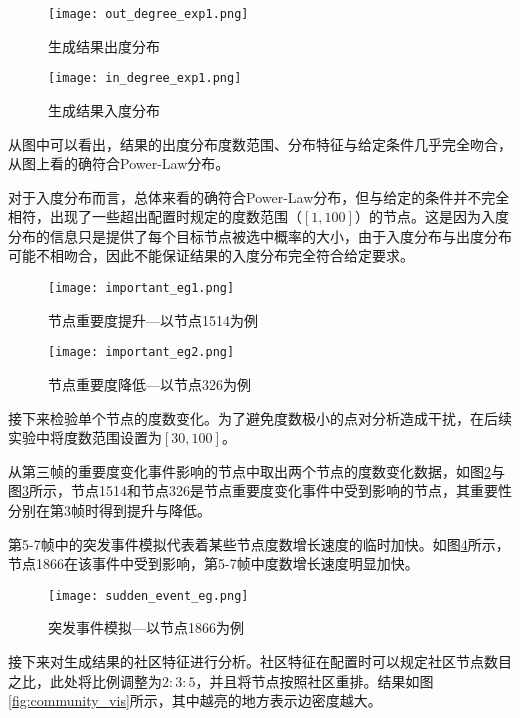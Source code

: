 \begin{figure}
\begin{minipage}{0.48\textwidth}
  \centering
  \texttt{[image: out\_degree\_exp1.png]}
  \caption{生成结果出度分布}
  \label{fig:parallel1}
\end{minipage}\hfill
\begin{minipage}{0.48\textwidth}
  \centering
  \texttt{[image: in\_degree\_exp1.png]}
  \caption{生成结果入度分布}
  \label{fig:parallel2}
\end{minipage}
\end{figure}

从图中可以看出，结果的出度分布度数范围、分布特征与给定条件几乎完全吻合，从图上看的确符合Power-Law分布。

对于入度分布而言，总体来看的确符合Power-Law分布，但与给定的条件并不完全相符，出现了一些超出配置时规定的度数范围（$[1, 100]$）的节点。这是因为入度分布的信息只是提供了每个目标节点被选中概率的大小，由于入度分布与出度分布可能不相吻合，因此不能保证结果的入度分布完全符合给定要求。

\begin{figure}[H]
  \centering
  \texttt{[image: important\_eg1.png]}
  \caption{节点重要度提升—以节点1514为例}
  \label{fig:important_eg1}
\end{figure}

\begin{figure}[H]
  \centering
  \texttt{[image: important\_eg2.png]}
  \caption{节点重要度降低—以节点326为例}
  \label{fig:important_eg2}
\end{figure}

接下来检验单个节点的度数变化。为了避免度数极小的点对分析造成干扰，在后续实验中将度数范围设置为$[30, 100]$。

从第三帧的重要度变化事件影响的节点中取出两个节点的度数变化数据，如图\ref{fig:important_eg1}与图\ref{fig:important_eg2}所示，节点1514和节点326是节点重要度变化事件中受到影响的节点，其重要性分别在第3帧时得到提升与降低。

第5-7帧中的突发事件模拟代表着某些节点度数增长速度的临时加快。如图\ref{fig:sudden_event_eg}所示，节点1866在该事件中受到影响，第5-7帧中度数增长速度明显加快。

\begin{figure}[H]
  \centering
  \texttt{[image: sudden\_event\_eg.png]}
  \caption{突发事件模拟—以节点1866为例}
  \label{fig:sudden_event_eg}
\end{figure}

接下来对生成结果的社区特征进行分析。社区特征在配置时可以规定社区节点数目之比，此处将比例调整为$2:3:5$，并且将节点按照社区重排。结果如图\ref{fig:community_vis}所示，其中越亮的地方表示边密度越大。

